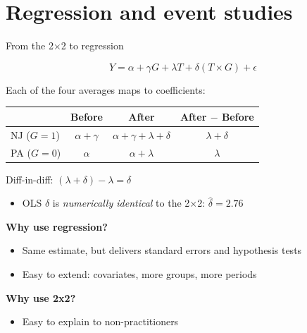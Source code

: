 \documentclass[compress, 8pt]{beamer}
\begin{document}
\section[Regression]{Regression and event studies}
\miniframesoff
\begin{frame}
    \tableofcontents[currentsection]
\end{frame}
\miniframeson

\begin{frame}{From the 2$\times$2 to regression}

\begin{equation*}
    Y = \alpha + \gamma G + \lambda T + \delta (T \times G) + \epsilon
\end{equation*}

Each of the four averages maps to coefficients:
\begin{table}
\begin{tabular}{lccc}
\hline
 & \textbf{Before} & \textbf{After} & \textbf{After $-$ Before} \\
\hline\hline
NJ ($G=1$) & $\alpha + \gamma$ & $\alpha + \gamma + \lambda + \delta$ & $\lambda + \delta$ \\
PA ($G=0$) & $\alpha$          & $\alpha + \lambda$                   & $\lambda$ \\
\hline
\end{tabular}
\end{table}
Diff-in-diff: $(\lambda + \delta) - \lambda = \delta$

\begin{itemize}
    \item OLS $\hat\delta$ is \emph{numerically identical} to the 2$\times$2: $\hat\delta = 2.76$
\end{itemize}

\vspace{2ex}
\textbf{Why use regression?}
\begin{itemize}
    \item Same estimate, but delivers standard errors and hypothesis tests
    \item Easy to extend: covariates, more groups, more periods
\end{itemize}

\vspace{2ex}
\textbf{Why use 2x2?}
\begin{itemize}
    \item Easy to explain to non-practitioners
\end{itemize}

\end{frame}
\end{document}
